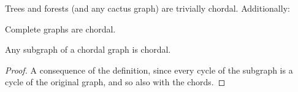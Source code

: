
Trees and forests (and any cactus graph) are trivially chordal.
Additionally:

\begin{prop}
  Complete graphs are chordal.
\end{prop}


\begin{prop}
  Any subgraph of a chordal graph is chordal.

  \begin{proof}
    A consequence of the definition, since every cycle of the subgraph is a cycle of the original graph, and so also with the chords.
  \end{proof}
\end{prop}
\strats
